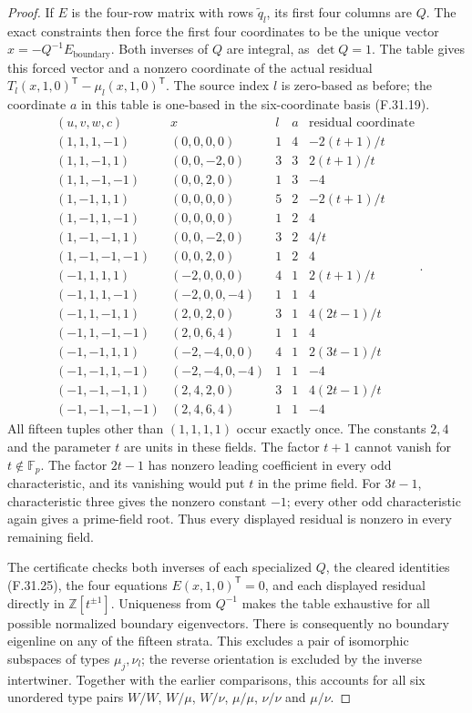 \begin{proof}
If $E$ is the four-row matrix with
rows $\widetilde q_l$, its first four
columns are $Q$. The exact constraints
then force the first four coordinates
to be the unique vector
$x=-Q^{-1}E_{\mathrm{boundary}}$.
Both inverses of $Q$ are integral,
as $\det Q=1$.
The table gives this forced vector
and a nonzero coordinate of the
actual residual
$T_l(x,1,0)^{\mathsf T}-\mu_l(x,1,0)^{\mathsf T}$.
The source index $l$ is zero-based
as before; the coordinate $a$ in this
table is one-based in the six-coordinate
basis (F.31.19).
\[
\begin{array}{c|c|c|c|c}
 (u,v,w,c)&x&l&a&\text{residual coordinate}\\\hline
 (1,1,1,-1)&(0,0,0,0)&1&4&-2(t+1)/t\\
 (1,1,-1,1)&(0,0,-2,0)&3&3&2(t+1)/t\\
 (1,1,-1,-1)&(0,0,2,0)&1&3&-4\\
 (1,-1,1,1)&(0,0,0,0)&5&2&-2(t+1)/t\\
 (1,-1,1,-1)&(0,0,0,0)&1&2&4\\
 (1,-1,-1,1)&(0,0,-2,0)&3&2&4/t\\
 (1,-1,-1,-1)&(0,0,2,0)&1&2&4\\
 (-1,1,1,1)&(-2,0,0,0)&4&1&2(t+1)/t\\
 (-1,1,1,-1)&(-2,0,0,-4)&1&1&4\\
 (-1,1,-1,1)&(2,0,2,0)&3&1&4(2t-1)/t\\
 (-1,1,-1,-1)&(2,0,6,4)&1&1&4\\
 (-1,-1,1,1)&(-2,-4,0,0)&4&1&2(3t-1)/t\\
 (-1,-1,1,-1)&(-2,-4,0,-4)&1&1&-4\\
 (-1,-1,-1,1)&(2,4,2,0)&3&1&4(2t-1)/t\\
 (-1,-1,-1,-1)&(2,4,6,4)&1&1&-4
\end{array}.
                                                               \tag{F.31.26}
\]
All fifteen tuples other than
$(1,1,1,1)$ occur exactly once.
The constants $2,4$ and the parameter
$t$ are units in these fields.
The factor $t+1$ cannot vanish for
$t\notin\mathbb F_p$.
The factor $2t-1$ has nonzero leading
coefficient in every odd characteristic,
and its vanishing would put $t$ in
the prime field. For $3t-1$, characteristic
three gives the nonzero constant $-1$;
every other odd characteristic again
gives a prime-field root.
Thus every displayed residual is
nonzero in every remaining field.

The certificate checks both inverses of
each specialized $Q$, the cleared
identities (F.31.25), the four equations
$E(x,1,0)^{\mathsf T}=0$, and each
displayed residual directly in
$\mathbb Z[t^{\pm1}]$.
Uniqueness from $Q^{-1}$ makes the
table exhaustive for all possible
normalized boundary eigenvectors.
There is consequently no boundary
eigenline on any of the fifteen strata.
This excludes a pair of isomorphic
subspaces of types $\mu_j,\nu_l$;
the reverse orientation is excluded
by the inverse intertwiner.
Together with the earlier comparisons,
this accounts for all six unordered
type pairs $W/W$, $W/\mu$, $W/\nu$,
$\mu/\mu$, $\nu/\nu$ and $\mu/\nu$.


\end{proof}
